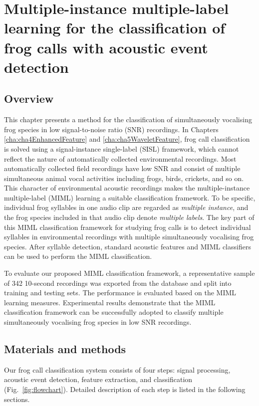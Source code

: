 
\chapter{Multiple-instance multiple-label learning for the classification of frog calls with acoustic event detection}
\label{cha:cha6MIML}


\section{Overview}
\label{sec:intro}

This chapter presents a method for the classification of simultaneously vocalising frog species in low signal-to-noise ratio (SNR) recordings. In Chapters \ref{cha:cha4EnhancedFeature} and \ref{cha:cha5WaveletFeature}, frog call classification is solved using a signal-instance single-label (SISL) framework, which cannot reflect the nature of automatically collected environmental recordings. Most automatically collected field recordings have low SNR and consist of multiple simultaneous animal vocal activities including frogs, birds, crickets, and so on. This character of environmental acoustic recordings makes the multiple-instance multiple-label (MIML) learning a suitable classification framework. To be specific, individual frog syllables in one audio clip are regarded as \textit{multiple instance}, and the frog species included in that audio clip denote \textit{multiple labels}. 
The key part of this MIML classification framework for studying frog calls is to detect individual syllables in environmental recordings with multiple simultaneously vocalising frog species. After syllable detection, standard acoustic features and MIML classifiers can be used to perform the MIML classification.


To evaluate our proposed MIML classification framework, a representative sample of 342 10-second recordings was exported from the database and split into training and testing sets. The performance is evaluated based on the MIML learning measures. Experimental results demonstrate that the MIML classification framework can be successfully adopted to classify multiple simultaneously vocalising frog species in low SNR recordings.



\section{Materials and methods}
Our frog call classification system consists of
four steps: signal processing, acoustic event detection, feature
extraction, and classification (Fig.~\ref{fig:flowchart}). Detailed description of each step is listed in the following sections. 

